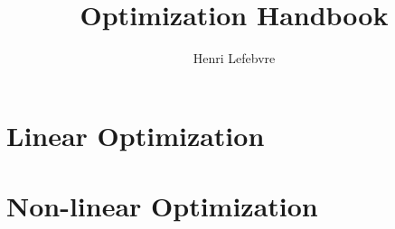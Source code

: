 \documentclass[twocolumn]{report}
\title{Optimization Handbook}
\author{Henri Lefebvre}
\begin{document}
    \maketitle
    \tableofcontents

    \part{Linear Optimization}
    
    
    
    
    
    
    
    
    

    \part{Non-linear Optimization}

    \begin{appendices}
        
    \end{appendices}

    
     

    \listoffigures
    \listoftables
    \listofalgorithms
\end{document}
